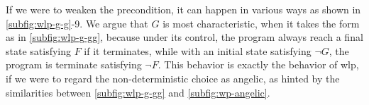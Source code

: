 If we were to weaken the precondition, it can happen in various ways as shown in \autoref{subfig:wlp-g-g}{\color{RoyalBlue}-9}. 
We argue that $G$ is most characteristic, when it takes the form as in \autoref{subfig:wlp-g-gg}, because under its control, the program always  reach a final state satisfying $F$ if it terminates, while with an initial state satisfying $\neg G$, the program is  terminate satisfying $\neg F$. 
This behavior is exactly the behavior of wlp, if we were to regard the non-deterministic choice as angelic, as hinted by the similarities between \autoref{subfig:wlp-g-gg} and \autoref{subfig:wp-angelic}. 

\begin{figure}[ht!]\centering
	\hfill

	\hfill


\end{figure}
